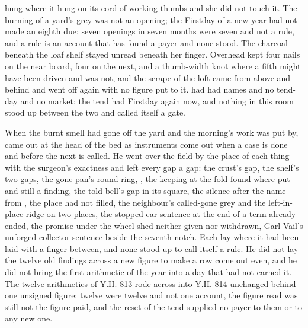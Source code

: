  hung where it hung on its cord of working thumbs and she did not touch it. The burning of a yard's grey was not an opening; the Firstday of a new year had not made an eighth due; seven openings in seven months were seven and not a rule, and a rule is an account that has found a payer and none stood. The charcoal beneath the loaf shelf stayed unread beneath her finger. Overhead  kept four nails on the near board, four on the next, and a thumb-width knot where a fifth might have been driven and was not, and the scrape of the loft came from above and behind and went off again with no figure put to it.  had had names and no tend-day and no market; the tend had Firstday again now, and nothing in this room stood up between the two and called itself a gate.

When the burnt smell had gone off the yard and the morning's work was put by,  came out at the head of the bed as instruments come out when a case is done and before the next is called. He went over the field by the place of each thing with the surgeon's exactness and left every gap a gap: the crust's gap, the shelf's two gaps, the gone pan's round ring, , the keeping at the fold found where put and still a finding, the told bell's gap in its square, the silence after the name from , the place  had not filled, the neighbour's called-gone grey and the left-in-place ridge on two places, the stopped ear-sentence at the end of a term already ended, the promise under the wheel-shed neither given nor withdrawn, Garl Vail's unforged collector sentence beside the seventh notch. Each lay where it had been laid with a finger between, and none stood up to call itself a rule. He did not lay the twelve old findings across a new figure to make a row come out even, and he did not bring the first arithmetic of the year into a day that had not earned it. The twelve arithmetics of Y.H. 813 rode across into Y.H. 814 unchanged behind one unsigned figure: twelve were twelve and not one account, the figure read was still not the figure paid, and the reset of the tend supplied no payer to them or to any new one.


